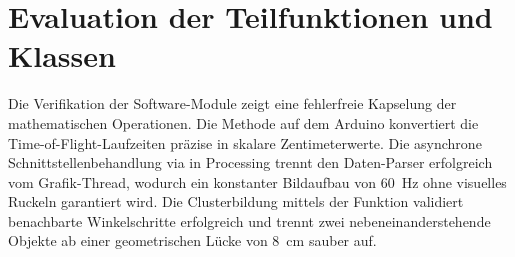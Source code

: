 \section{Evaluation der Teilfunktionen und Klassen}
Die Verifikation der Software-Module zeigt eine fehlerfreie Kapselung der mathematischen Operationen. Die Methode  auf dem Arduino konvertiert die Time-of-Flight-Laufzeiten präzise in skalare Zentimeterwerte. Die asynchrone Schnittstellenbehandlung via  in Processing trennt den Daten-Parser erfolgreich vom Grafik-Thread, wodurch ein konstanter Bildaufbau von 60~Hz ohne visuelles Ruckeln garantiert wird. Die Clusterbildung mittels der Funktion  validiert benachbarte Winkelschritte erfolgreich und trennt zwei nebeneinanderstehende Objekte ab einer geometrischen Lücke von 8~cm sauber auf.